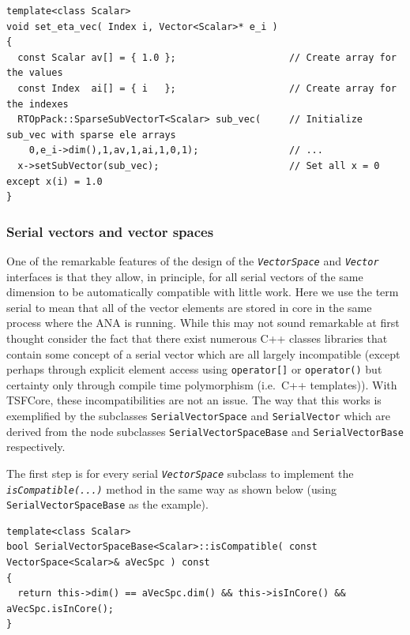 {\scriptsize\begin{verbatim}
template<class Scalar>
void set_eta_vec( Index i, Vector<Scalar>* e_i )
{
  const Scalar av[] = { 1.0 };                    // Create array for the values
  const Index  ai[] = { i   };                    // Create array for the indexes
  RTOpPack::SparseSubVectorT<Scalar> sub_vec(     // Initialize sub_vec with sparse ele arrays
    0,e_i->dim(),1,av,1,ai,1,0,1);                // ...
  x->setSubVector(sub_vec);                       // Set all x = 0 except x(i) = 1.0
}
\end{verbatim}}

%
\subsubsection{Serial vectors and vector spaces}
\label{tsfcore:sec:serial_vecs}
%

One of the remarkable features of the design of the
\texttt{\textit{VectorSpace}} and \texttt{\textit{Vector}} interfaces
is that they allow, in principle, for all serial vectors of the same
dimension to be automatically compatible with little work.  Here we
use the term serial to mean that all of the vector elements are stored
in core in the same process where the ANA is running.  While this may
not sound remarkable at first thought consider the fact that there
exist numerous C++ classes libraries that contain some concept of a
serial vector \cite{ref:lumsdaine_and_siek_1998, ref:tnt,
ref:roberts_et_al_1996, ref:math++_1996} which are all largely
incompatible (except perhaps through explicit element access using
\texttt{operator[]} or \texttt{operator()} but certainty only
through compile time polymorphism (i.e.~C++ templates)).  With
TSFCore, these incompatibilities are not an issue.  The way that this
works is exemplified by the subclasses \texttt{SerialVectorSpace} and
\texttt{SerialVector} which are derived from the node subclasses
\texttt{Serial\-VectorSpace\-Base} and
\texttt{SerialVectorBase} respectively.

The first step is for every serial \texttt{\textit{VectorSpace}}
subclass to implement the \texttt{\textit{isCompatible(\-...)}}  method
in the same way as shown below (using \texttt{SerialVectorSpaceBase}
as the example).

{\scriptsize\begin{verbatim}
template<class Scalar>
bool SerialVectorSpaceBase<Scalar>::isCompatible( const VectorSpace<Scalar>& aVecSpc ) const
{
  return this->dim() == aVecSpc.dim() && this->isInCore() && aVecSpc.isInCore();
}
\end{verbatim}}

